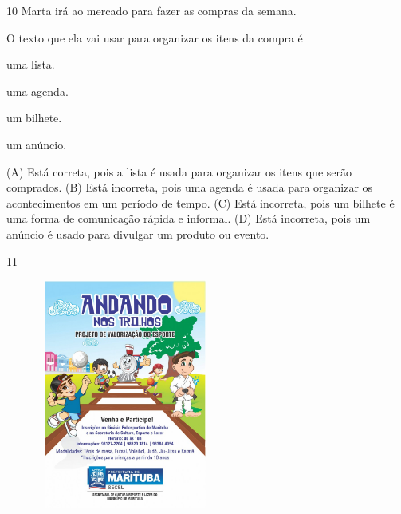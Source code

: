 \num{10} Marta irá ao mercado para fazer as compras da semana.

O texto que ela vai usar para organizar os itens da compra é

\begin{minipage}{.5\textwidth}
\begin{escolha}
\item uma lista.

\item uma agenda.

\item um bilhete.

\item um anúncio.
\end{escolha}
\end{minipage}

(A) Está correta, pois a lista é usada para organizar os itens que serão comprados.
(B) Está incorreta, pois uma agenda é usada para organizar os acontecimentos em um período de tempo.
(C) Está incorreta, pois um bilhete é uma forma de comunicação rápida e informal.
(D) Está incorreta, pois um anúncio é usado para divulgar um produto ou evento.

\num{11}

\includegraphics[width=3.11515in,height=2.97237in]{media/image170.jpeg}


